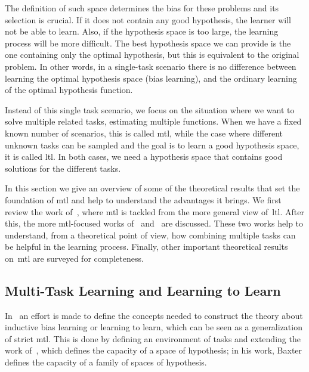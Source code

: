 The definition of such space determines the bias for these problems and its selection is crucial. If it does not contain any good hypothesis, the learner will not be able to learn.
Also, if the hypothesis space is too large, the learning process will be more difficult.
The best hypothesis space we can provide is the one containing only the optimal hypothesis, but this is equivalent to the original problem. In other words, in a single-task scenario there is no difference between learning the optimal hypothesis space (bias learning),
and the ordinary learning of the optimal hypothesis function.

Instead of this single task scenario, we focus on the situation where we want to solve multiple related tasks, estimating multiple functions. When we have a fixed known number of scenarios, this is called \acrshort{mtl}, while the case where different unknown tasks can be sampled and the goal is to learn a good hypothesis space, it is called \acrshort{ltl}. In both cases, we need a hypothesis space that contains good solutions for the different tasks.

In this section we give an overview of some of the theoretical results that set the foundation of \acrshort{mtl} and help to understand the advantages it brings. We first review the work of~\citet{baxter2000model}, where \acrshort{mtl} is tackled from the more general view of~\acrshort{ltl}. After this, the more \acrshort{mtl}-focused works of~\citet{Ben-DavidB08} and~\citet{Ben-DavidS03} are discussed.
%
These two works help to understand, from a theoretical point of view, how combining multiple tasks can be helpful in the learning process.
%
Finally, other important theoretical results on~\acrshort{mtl} are surveyed for completeness.
\subsection{Multi-Task Learning and Learning to Learn} %
%
In~\cite{baxter2000model} an effort is made to define the concepts needed to construct the theory about inductive bias learning or learning to learn, which can be seen as a generalization of strict \acrshort{mtl}. This is done by defining an environment of tasks and extending the work of~\cite{Vapnik00}, which defines the capacity of a space of hypothesis; in his work, Baxter defines the capacity of a family of spaces of hypothesis.

